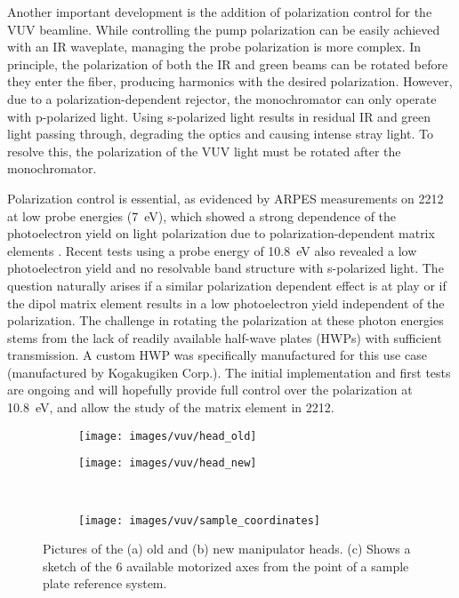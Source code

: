 Another important development is the addition of polarization control for the VUV beamline.
While controlling the pump polarization can be easily achieved with an IR waveplate, managing the probe polarization is more complex.
In principle, the polarization of both the IR and green beams can be rotated before they enter the fiber, producing harmonics with the desired polarization.
However, due to a polarization-dependent rejector, the monochromator can only operate with p-polarized light.
Using s-polarized light results in residual IR and green light passing through, degrading the optics and causing intense stray light.
To resolve this, the polarization of the VUV light must be rotated after the monochromator.

Polarization control is essential, as evidenced by ARPES measurements on 2212 at low probe energies (\qty{7}{\electronvolt}), which showed a strong dependence of the photoelectron yield on light polarization due to polarization-dependent matrix elements \cite{fanciulli_spin_2018}.
Recent tests using a probe energy of \qty{10.8}{\electronvolt} also revealed a low photoelectron yield and no resolvable band structure with s-polarized light.
The question naturally arises if a similar polarization dependent effect is at play or if the dipol matrix element results in a low photoelectron yield independent of the polarization.
The challenge in rotating the polarization at these photon energies stems from the lack of readily available half-wave plates (HWPs) with sufficient transmission.
A custom HWP was specifically manufactured for this use case (manufactured by Kogakugiken Corp.).
The initial implementation and first tests are ongoing and will hopefully provide full control over the polarization at \qty{10.8}{\electronvolt}, and allow the study of the matrix element in 2212.

\begin{figure}[t]
	\centering
	\begin{subfigure}[b]{0.45\textwidth}
		\texttt{[image: images/vuv/head\_old]}
		\caption{}
	\end{subfigure}
	\begin{subfigure}[b]{0.45\textwidth}
		\texttt{[image: images/vuv/head\_new]}
		\caption{}
	\end{subfigure}
	\\
	\begin{subfigure}[b]{0.45\textwidth}
		\texttt{[image: images/vuv/sample\_coordinates]}
		\caption{}
	\end{subfigure}
	\caption{Pictures of the (a) old and (b) new manipulator heads. (c) Shows a sketch of the 6 available motorized axes from the point of a sample plate reference system.}
	\label{fig:manip_head}
\end{figure}

